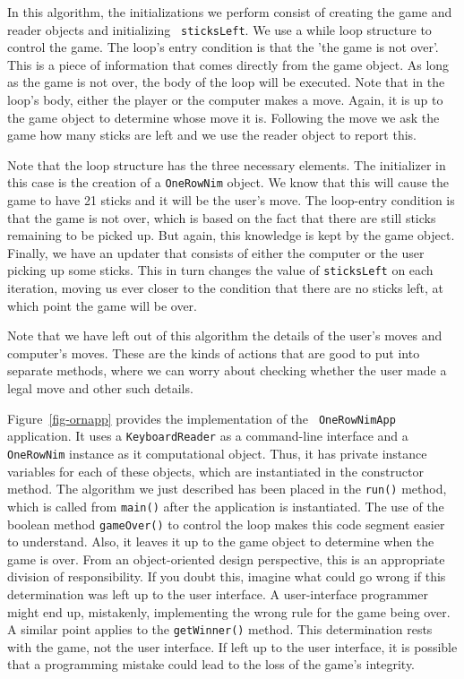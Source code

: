 \noindent In this algorithm, the initializations we perform consist
of creating the game and reader objects and initializing {\tt
sticksLeft}. We use a while loop structure to control the game.  The
loop's entry condition is that the 'the game is not over'.  This is a
piece of information that comes directly from the game object.  As
long as the game is not over, the body of the loop will be
executed. Note that in the loop's body, either the player or the
computer makes a move. Again, it is up to the game object to determine
whose move it is.  Following the move we ask the game how many sticks
are left and we use the reader object to report this.

Note that the loop structure has the three necessary elements. The
initializer in this case is the creation of a {\tt OneRowNim}
object. We know that this will cause the game to have 21 sticks and
it will be the user's move. The loop-entry condition is that the
game is not over, which is based on the fact that there are still
sticks remaining to be picked up. But again, this knowledge is kept by
the game object. Finally, we have an updater that consists of either
the computer or the user picking up some sticks. This in turn changes
the value of {\tt sticksLeft} on each iteration, moving us ever closer
to the condition that there are no sticks left, at which point
the game will be over. 

Note that we have left out of this algorithm the details of the user's
moves and computer's moves. These are the kinds of actions that are
good to put into separate methods, where we can worry about checking
whether the user made a legal move and other such details.

Figure~\ref{fig-ornapp} provides the implementation of the {\tt
OneRowNimApp} application.  It uses a {\tt KeyboardReader} as a
command-line interface and a {\tt OneRowNim} instance as it computational
object. Thus, it has private instance variables for each of these
objects, which are instantiated in the constructor method.
The algorithm we just described has been placed in the {\tt run()}
method, which is called from {\tt main()} after the application is
instantiated. The use of the boolean method {\tt gameOver()} to control
the loop makes this code segment easier to understand. Also, it
leaves it up to the game object to determine when the game is over.
From an object-oriented design perspective, this is an appropriate
division of responsibility.  If you doubt this, imagine what could go
wrong if this determination was left up to the user interface. A
user-interface programmer might end up, mistakenly, implementing the
wrong rule for the game being over. A similar point applies to the
{\tt getWinner()} method. This determination rests with the game, not
the user interface. If left up to the user interface, it is possible
that a programming mistake could lead to the loss of the game's
integrity.

